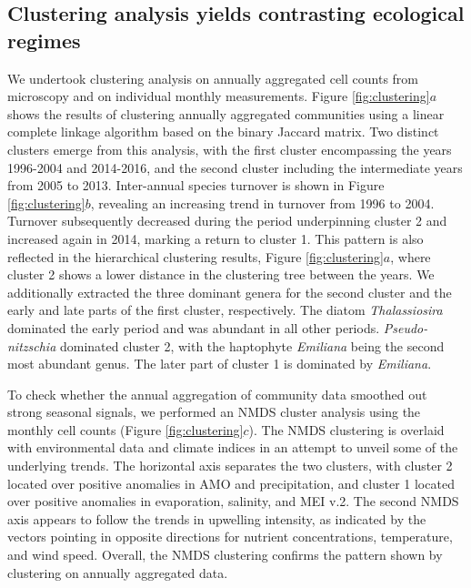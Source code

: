 \documentclass[draft]{agujournal2019}
\begin{document}
\subsection{Clustering analysis yields contrasting ecological regimes}
    We undertook clustering analysis on annually aggregated cell counts from microscopy and on individual monthly measurements. Figure \ref{fig:clustering}$a$ shows the results of clustering annually aggregated communities using a linear complete linkage algorithm based on the binary Jaccard matrix. Two distinct clusters emerge from this analysis, with the first cluster encompassing the years 1996-2004 and 2014-2016, and the second cluster including the intermediate years from 2005 to 2013. 
    Inter-annual species turnover is shown in Figure \ref{fig:clustering}$b$, revealing an increasing trend in turnover from 1996 to 2004. Turnover subsequently decreased during the period underpinning cluster 2 and increased again in 2014, marking a return to cluster 1. This pattern is also reflected in the hierarchical clustering results, Figure \ref{fig:clustering}$a$, where cluster 2 shows a lower distance in the clustering tree between the years. We additionally extracted the three dominant genera for the second cluster and the early and late parts of the first cluster, respectively. The diatom \textit{Thalassiosira} dominated the early period and was abundant in all other periods. \textit{Pseudo-nitzschia} dominated cluster 2, with the haptophyte \textit{Emiliana} being the second most abundant genus. The later part of cluster 1 is dominated by \textit{Emiliana}. 
    
    To check whether the annual aggregation of community data smoothed out strong seasonal signals, we performed an NMDS cluster analysis using the monthly cell counts (Figure \ref{fig:clustering}$c$). The NMDS clustering is overlaid with environmental data and climate indices in an attempt to unveil some of the underlying trends. The horizontal axis separates the two clusters, with cluster 2 located over positive anomalies in AMO and precipitation, and cluster 1 located over positive anomalies in evaporation, salinity, and MEI v.2. The second NMDS axis appears to follow the trends in upwelling intensity, as indicated by the vectors pointing in opposite directions for nutrient concentrations, temperature, and wind speed. Overall, the NMDS clustering confirms the pattern shown by clustering on annually aggregated data. 
    
\end{document}
